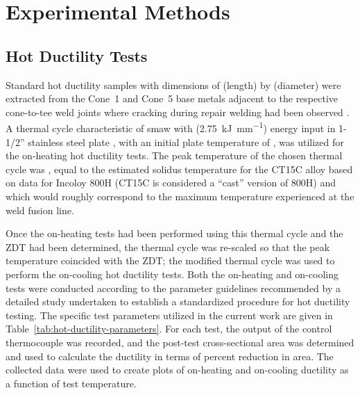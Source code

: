 \chapter{Experimental Methods} \label{ch:experimental-methods}

\section{Hot Ductility Tests}
Standard hot ductility samples with dimensions of  (length) by  (diameter) were extracted from the Cone~1 and Cone~5 base metals adjacent to the respective cone-to-tee weld joints where cracking during repair welding had been observed \cite{hoffman_weld_1998}.  A thermal cycle characteristic of \gls{smaw} with  (\SI[round-mode=places,round-precision=2]{2.75}{\kilo\joule\per\milli\meter}) energy input in 1-1/2” stainless steel plate \cite{nippes_heat-affected_1955}, with an initial plate temperature of , was utilized for the on-heating hot ductility tests.  The peak temperature of the chosen thermal cycle was , equal to the estimated solidus temperature for the CT15C alloy based on data for Incoloy 800H (CT15C is considered a ``cast'' version of 800H) and which would roughly correspond to the maximum temperature experienced at the weld fusion line.

Once the on-heating tests had been performed using this thermal cycle and the ZDT had been determined, the thermal cycle was re-scaled so that the peak temperature coincided with the ZDT; the modified thermal cycle was used to perform the on-cooling hot ductility tests.  Both the on-heating and on-cooling tests were conducted according to the parameter guidelines recommended by a detailed study \cite{lundin_standardization_1990_experiment} undertaken to establish a standardized procedure for hot ductility testing.  The specific test parameters utilized in the current work are given in Table~\ref{tab:hot-ductility-parameters}.  For each test, the output of the control thermocouple was recorded, and the post-test cross-sectional area was determined and used to calculate the ductility in terms of percent reduction in area.  The collected data were used to create plots of on-heating and on-cooling ductility as a function of test temperature.

